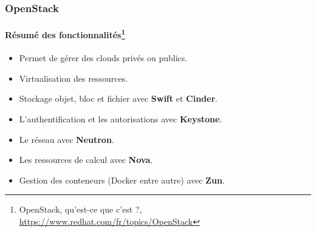 \documentclass{beamer}
\begin{document}
    \begin{frame}
        \transdissolve
        \frametitle{OpenStack}
        \framesubtitle{Résumé des fonctionnalités\footnote{\label{redhatopentack}OpenStack, qu'est-ce que c'est ?, \url{https://www.redhat.com/fr/topics/OpenStack}}}
        \begin{itemize}
            \item Permet de gérer des clouds privés ou publics.
            \item Virtualisation des ressources.
            \item Stockage objet, bloc et fichier avec \textbf{Swift} et \textbf{Cinder}.
            \item L'authentification et les autorisations avec \textbf{Keystone}.
            \item Le réseau avec \textbf{Neutron}.
            \item Les ressources de calcul avec \textbf{Nova}.
            \item Gestion des conteneurs (Docker entre autre) avec \textbf{Zun}.
        \end{itemize}
    \end{frame}
\end{document}

